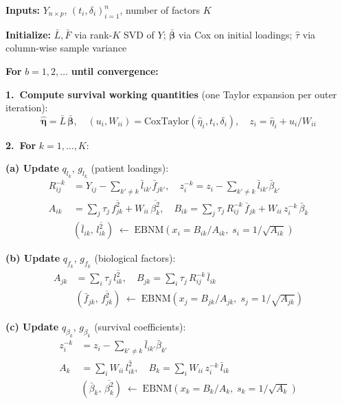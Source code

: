 \documentclass[11pt]{article}
\newcommand{\lbar}[2]{\bar{l}_{#1#2}}
\newcommand{\fbar}[2]{\bar{f}_{#1#2}}
\newcommand{\betabar}[1]{\bar{\beta}_{#1}}
\newcommand{\lsec}[2]{\overline{l^2_{#1#2}}}
\newcommand{\fsec}[2]{\overline{f^2_{#1#2}}}
\newcommand{\betasec}[1]{\overline{\beta^2_{#1}}}
\begin{document}
\begin{tcolorbox}[colback=gray!5, colframe=black!60,
                  title=Supervised Matrix Factorization --- CAVI Algorithm,
                  fonttitle=\bfseries]

\textbf{Inputs:} $Y_{n\times p}$, $(t_i, \delta_i)_{i=1}^n$, number of
factors $K$

\textbf{Initialize:} $\bar{L}, \bar{F}$ via rank-$K$ SVD of $Y$;
  $\bar{\bm{\beta}}$ via Cox on initial loadings;
  $\hat{\tau}$ via column-wise sample variance

\bigskip
\textbf{For} $b = 1, 2, \ldots$ \textbf{until convergence:}

\smallskip
\quad\textbf{1.\ Compute survival working quantities} (one Taylor expansion
per outer iteration):
\[
  \hat{\bm{\eta}} = \bar{L}\,\bar{\bm{\beta}}, \quad
  (u_i, W_{ii}) = \text{CoxTaylor}(\hat{\eta}_i, t_i, \delta_i), \quad
  z_i = \hat{\eta}_i + u_i/W_{ii}
\]

\smallskip
\quad\textbf{2.\ For} $k = 1, \ldots, K$:

\smallskip
\qquad\textbf{(a) Update} $q_{l_k}$, $g_{l_k}$ (patient loadings):
\begin{align*}
  R^{-k}_{ij} &= Y_{ij} - \textstyle\sum_{k'\neq k}\lbar{i}{k'}\fbar{j}{k'},
  \quad
  z^{-k}_i = z_i - \textstyle\sum_{k'\neq k}\lbar{i}{k'}\betabar{k'} \\
  A_{ik} &= \textstyle\sum_j \tau_j\,\fsec{j}{k} + W_{ii}\,\betasec{k},
  \quad
  B_{ik} = \textstyle\sum_j \tau_j\,R^{-k}_{ij}\,\fbar{j}{k}
           + W_{ii}\,z^{-k}_i\,\betabar{k} \\
  &(\lbar{i}{k},\,\lsec{i}{k})
    \;\leftarrow\; \mathrm{EBNM}(x_i = B_{ik}/A_{ik},\; s_i = 1/\sqrt{A_{ik}})
\end{align*}

\qquad\textbf{(b) Update} $q_{f_k}$, $g_{f_k}$ (biological factors):
\begin{align*}
  A_{jk} &= \textstyle\sum_i \tau_j\,\lsec{i}{k},
  \quad
  B_{jk} = \textstyle\sum_i \tau_j\,R^{-k}_{ij}\,\lbar{i}{k}\\
  &(\fbar{j}{k},\,\fsec{j}{k})
    \;\leftarrow\; \mathrm{EBNM}(x_j = B_{jk}/A_{jk},\; s_j = 1/\sqrt{A_{jk}})
\end{align*}

\qquad\textbf{(c) Update} $q_{\beta_k}$, $g_{\beta_k}$ (survival coefficients):
\begin{align*}
  z^{-k}_i &= z_i - \textstyle\sum_{k'\neq k}\lbar{i}{k'}\betabar{k'} \\
  A_k &= \textstyle\sum_i W_{ii}\,\lsec{i}{k},
  \quad
  B_k = \textstyle\sum_i W_{ii}\,z^{-k}_i\,\lbar{i}{k}\\
  &(\betabar{k},\,\betasec{k})
    \;\leftarrow\; \mathrm{EBNM}(x_k = B_k/A_k,\; s_k = 1/\sqrt{A_k})
\end{align*}


\end{tcolorbox}
\end{document}
